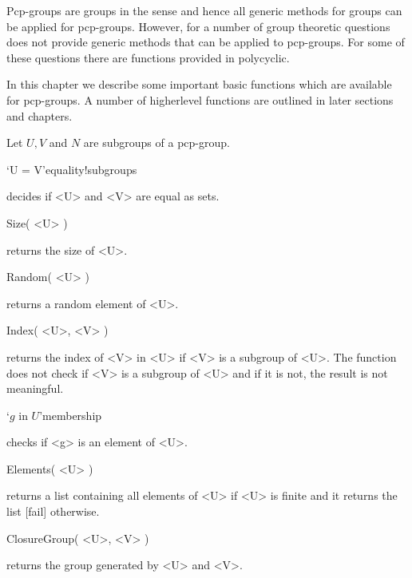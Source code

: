 

Pcp-groups are groups in the {\GAP} sense and hence all generic {\GAP}
methods for groups can be applied for pcp-groups.  However, for a
number of group theoretic questions {\GAP} does not provide generic
methods that can be applied to pcp-groups. For some of these questions
there are functions provided in {\sf polycyclic}.

\label{methods}

In this chapter we describe some important basic functions which are 
available for pcp-groups. A number of higherlevel functions are outlined 
in later sections and chapters.

Let $U, V$ and $N$ are subgroups of a pcp-group.

\>`U = V'{equality}!{subgroups}

decides if <U> and <V> are equal as sets.

\>Size( <U> )

returns the size of <U>.

\>Random( <U> )

returns a random element of <U>. 

\>Index( <U>, <V> )

returns the index of  <V> in <U>  if <V>  is  a subgroup of  <U>.  The
function does not check if <V> is a subgroup of <U> and  if it is not,
the result is not meaningful.

\>`$g$ in $U$'{membership}

checks if <g> is an element of <U>.

\>Elements( <U> )

returns a list  containing all elements of  <U> if <U> is finite and it
returns the list [fail] otherwise.

\>ClosureGroup( <U>, <V> )

returns the group generated by <U> and <V>.

